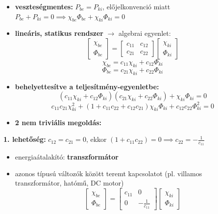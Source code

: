 \begin{itemize}
    \item \textbf{veszteségmentes:} $P_{be} = P_{ki}$, előjelkonvenció miatt $P_{be} + P_{ki} = 0 \implies \chi_{be}\Phi_{be} + \chi_{ki}\Phi_{ki} = 0$
    \item \textbf{lineáris, statikus rendszer} $\rightarrow$ algebrai egyenlet:
    $$ \begin{bmatrix} \chi_{be} \\ \Phi_{be} \end{bmatrix} = \begin{bmatrix} c_{11} & c_{12} \\ c_{21} & c_{22} \end{bmatrix} \begin{bmatrix} \chi_{ki} \\ \Phi_{ki} \end{bmatrix} $$
    $$ \chi_{be} = c_{11}\chi_{ki} + c_{12}\Phi_{ki} $$
    $$ \Phi_{be} = c_{21}\chi_{ki} + c_{22}\Phi_{ki} $$
    \item \textbf{behelyettesítve a teljesítmény-egyenletbe:}
    $$ (c_{11}\chi_{ki} + c_{12}\Phi_{ki})(c_{21}\chi_{ki} + c_{22}\Phi_{ki}) + \chi_{ki}\Phi_{ki} = 0 $$
    $$ c_{11}c_{21}\chi_{ki}^2 + (1 + c_{11}c_{22} + c_{12}c_{21})\chi_{ki}\Phi_{ki} + c_{12}c_{22}\Phi_{ki}^2 = 0 $$
    \item \textbf{2 nem triviális megoldás:}
\end{itemize}

\noindent \textbf{1. lehetőség:} $c_{12} = c_{21} = 0$, ekkor $(1 + c_{11}c_{22}) = 0 \implies c_{22} = - \frac{1}{c_{11}}$
\begin{itemize}
    \item energiaátalakító: \textbf{transzformátor}
    \item azonos típusú változók között teremt kapcsolatot (pl. villamos transzformátor, hatómű, DC motor)
    $$ \begin{bmatrix} \chi_{be} \\ \Phi_{be} \end{bmatrix} = \begin{bmatrix} c_{11} & 0 \\ 0 & -\frac{1}{c_{11}} \end{bmatrix} \begin{bmatrix} \chi_{ki} \\ \Phi_{ki} \end{bmatrix} $$
\end{itemize}

